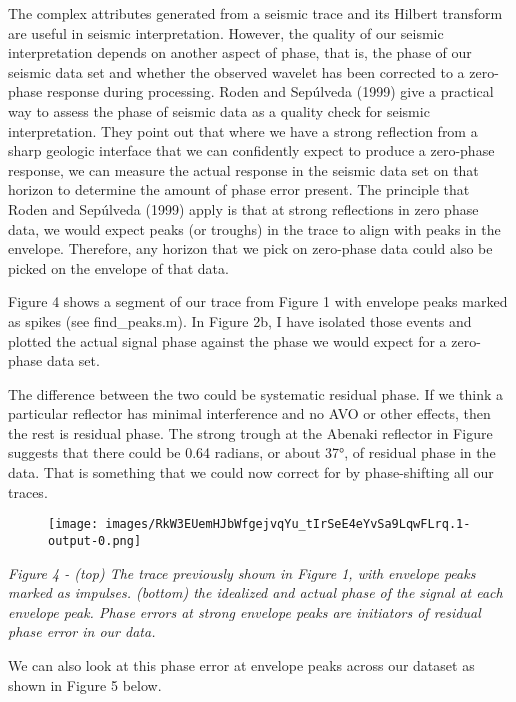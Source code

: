 The complex attributes generated from a seismic trace and its Hilbert transform are useful in seismic interpretation. However, the quality of our seismic interpretation depends on another aspect of phase, that is, the phase of our seismic data set and whether the observed wavelet has been corrected to a zero-phase response during processing. Roden and Sepúlveda (1999) give a practical way to assess the phase of seismic data as a quality check for seismic interpretation. They point out that where we have a strong reflection from a sharp geologic interface that we can confidently expect to produce a zero-phase response, we can measure the actual response in the seismic data set on that horizon to determine the amount of phase error present. The principle that Roden and Sepúlveda (1999) apply is that at strong reflections in zero phase data, we would expect peaks (or troughs) in the trace to align with peaks in the envelope. Therefore, any horizon that we pick on zero-phase data could also be picked on the envelope of that data.

Figure 4 shows a segment of our trace from Figure 1 with envelope peaks marked as spikes (see find\_peaks.m). In Figure 2b, I have isolated those events and plotted the actual signal phase against the phase we would expect for a zero-phase data set.

The difference between the two could be systematic residual phase. If we think a particular reflector has minimal interference and no AVO or other effects, then the rest is residual phase. The strong trough at the Abenaki reflector in Figure suggests that there could be 0.64 radians, or about 37°, of residual phase in the data. That is something that we could now correct for by phase-shifting all our traces.



  \begin{figure}[ht]
    \centering
    \texttt{[image: images/RkW3EUemHJbWfgejvqYu\_tIrSeE4eYvSa9LqwFLrq.1-output-0.png]}
  \end{figure}


\textit{Figure 4 - (top) The trace previously shown in Figure 1, with envelope peaks marked as impulses. (bottom) the idealized and actual phase of the signal at each envelope peak. Phase errors at strong envelope peaks are initiators of residual phase error in our data.}

We can also look at this phase error at envelope peaks across our dataset as shown in Figure 5 below.



